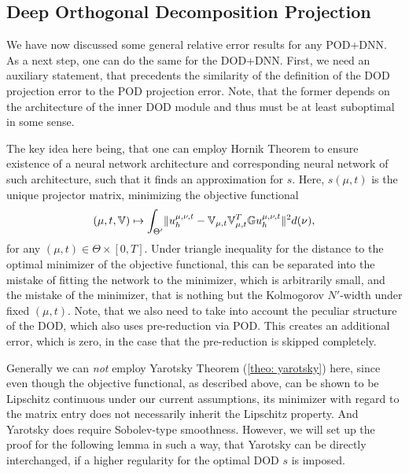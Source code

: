 \subsection{Deep Orthogonal Decomposition Projection}




We have now discussed some general relative error results for any POD+DNN. 
As a next step, one can do the same for the DOD+DNN. First, we need
an auxiliary statement, that precedents the similarity of the definition of the DOD projection error to the POD projection
error. Note, that the former depends on the architecture of the inner DOD module and thus must be at least suboptimal 
in some sense. 

The key idea here being, that one can employ Hornik Theorem to ensure existence of a neural network architecture and corresponding neural 
network of such architecture, such that it finds an approximation for $s$. 
Here, $s(\mu, t)$ is the unique projector matrix, minimizing the objective functional 
\begin{equation*}
    (\mu, t, \mathbb{V}) \mapsto \int_{\Theta'} \lVert u_h^{\mu, \nu, t} - \mathbb{V}_{\mu, t} \mathbb{V}_{\mu, t}^T \mathbb{G} u_h^{\mu, \nu, t} \rVert^2 d (\nu),
\end{equation*}
for any $(\mu, t) \in \Theta \times [0, T]$. 
Under triangle inequality for the distance to the optimal minimizer of the objective functional, this can be separated
into the mistake of fitting the network to 
the minimizer, which is arbitrarily small, and the mistake of the minimizer, that is nothing
but the Kolmogorov $N'$-width under fixed $(\mu, t)$. Note, that we also need to take into account the peculiar
structure of the DOD, which also uses pre-reduction via POD. This creates an additional error, which is zero, in the case
that the pre-reduction is skipped completely.

\begin{remark} \label{remark: regularity for s}
    Generally we can \emph{not} employ Yarotsky Theorem (\ref{theo: yarotsky}) here, since even though 
    the objective
    functional, as described above, can be shown to be Lipschitz continuous under our current 
    assumptions, its minimizer with regard to the matrix entry does not 
    necessarily inherit the Lipschitz property. And Yarotsky
    does require Sobolev-type smoothness. However, we will set up the proof for the following lemma in such a way,
    that Yarotsky can be directly interchanged, if a higher regularity for the optimal DOD $s$ is
    imposed.
\end{remark}

